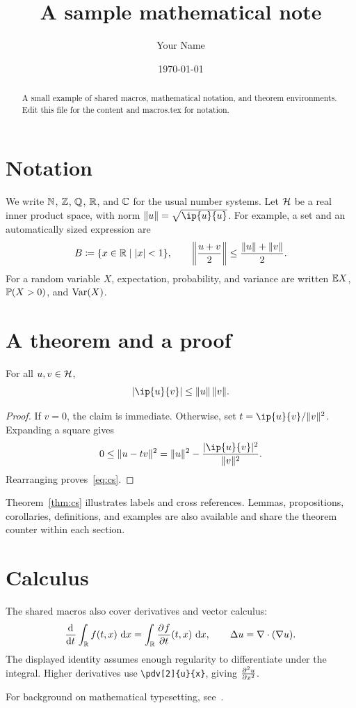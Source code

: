 \documentclass[11pt]{amsart}
\title{A sample mathematical note}
\author{Your Name}
\date{\today}
\begin{document}
\begin{abstract}
  A small example of shared macros, mathematical notation, and theorem
  environments. Edit this file for the content and macros.tex for notation.
\end{abstract}
\maketitle
\linenumbers %

\section{Notation}
We write $\N$, $\Z$, $\Q$, $\R$, and $\C$ for the usual number systems.
Let $\cH$ be a real inner product space, with norm
$\norm{u} = \sqrt{\ip{u}{u}}$.
For example, a set and an automatically sized expression are
\[
  B \defeq \set{x \in \R \st \abs{x} < 1},
  \qquad
  \norm*{\frac{u+v}{2}} \leq \frac{\norm{u}+\norm{v}}{2}.
\]
For a random variable $X$, expectation, probability, and variance are
written $\E X$, $\Prob\paren{X>0}$, and $\var(X)$.

\section{A theorem and a proof}
\begin{theorem}\label{thm:cs}
  For all $u,v\in\cH$,
  \begin{equation}\label{eq:cs}
    \abs{\ip{u}{v}} \leq \norm{u}\,\norm{v}.
  \end{equation}
\end{theorem}
\begin{proof}
  If $v=0$, the claim is immediate. Otherwise, set
  $t=\ip{u}{v}/\norm{v}^2$. Expanding a square gives
  \[
    0 \leq \norm{u-tv}^2
      = \norm{u}^2-\frac{\abs{\ip{u}{v}}^2}{\norm{v}^2}.
  \]
  Rearranging proves~\eqref{eq:cs}.
\end{proof}
\begin{remark}
  Theorem~\ref{thm:cs} illustrates labels and cross references.
  Lemmas, propositions, corollaries, definitions, and examples are also
  available and share the theorem counter within each section.
\end{remark}

\section{Calculus}
The shared macros also cover derivatives and vector calculus:
\[
  \odv{}{t}\int_{\R} f(t,x)\,\dd x
    = \int_{\R}\pdv{f}{t}(t,x)\,\dd x,
  \qquad \lap u = \dv(\grad u).
\]
The displayed identity assumes enough regularity to differentiate under
the integral. Higher derivatives use \verb|\pdv[2]{u}{x}|, giving
$\pdv[2]{u}{x}$.

For background on mathematical typesetting, see~\cite{knuth1984}.

\printbibliography
\end{document}
